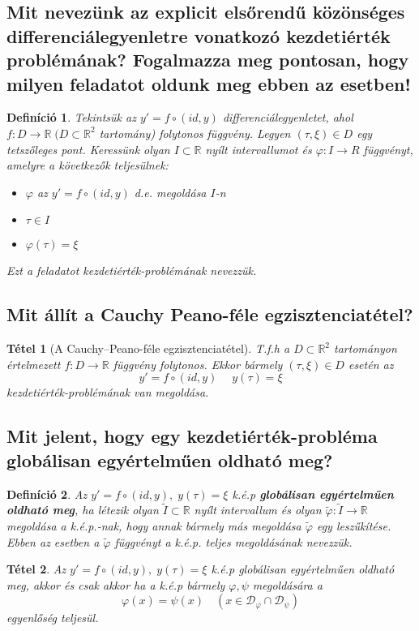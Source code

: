 \documentclass[12pt,a4paper]{article}
\newcommand{\R}{\mathbb{R}}
\newcommand{\CD}{\mathcal{D}}
\newcommand{\f}{\varphi}
\newcommand{\bb}[1]{\left( #1 \right)}
\newtheorem{tet}{Tétel}[section]
\newtheorem{defi}{Definíció}[section]
\begin{document}
\subsection{Mit nevezünk az explicit elsőrendű közönséges differenciálegyenletre vonatkozó kezdetiérték problémának? Fogalmazza meg pontosan, hogy milyen feladatot oldunk meg ebben az esetben!}
\begin{defi}
Tekintsük az $y' = f \circ (id, y)$ differenciálegyenletet, ahol $f : D \to \R \; (D \subset \R^2$ tartomány) folytonos függvény. Legyen $(\tau, \xi) \in D$ egy tetszőleges pont. Keressünk olyan $I \subset \R$ nyílt intervallumot és $\f : I \to R$ függvényt, amelyre a következők teljesülnek:
\begin{itemize}
\item $\f$ az $y' = f \circ (id,y)$ d.e. megoldása $I$-n
\item $\tau \in I$
\item $\f(\tau) = \xi$ 
\end{itemize} 
Ezt a feladatot kezdetiérték-problémának nevezzük.
\end{defi}
\subsection{Mit állít a Cauchy Peano-féle egzisztenciatétel?}
\begin{tet}[A Cauchy–Peano-féle egzisztenciatétel]
T.f.h a $D \subset \R^2$ tartományon értelmezett $f: D \to \R$ függvény folytonos. Ekkor bármely $\bb{\tau,\xi} \in D$ esetén az 
\[
y' = f \circ \bb{id,y} \quad \; y(\tau) = \xi
\]
kezdetiérték-problémának van megoldása.
\end{tet}
\subsection{Mit jelent, hogy egy kezdetiérték-probléma globálisan egyértelműen oldható meg?}
\begin{defi}
Az $y' = f \circ \bb{id,y}, \; y(\tau) = \xi$ k.é.p \textbf{globálisan egyértelműen oldható meg}, ha létezik olyan $\tilde{I} \subset \R$ nyílt intervallum és olyan $\tilde{\f}: \tilde{I} \to \R$ megoldása a k.é.p.-nak, hogy annak bármely más megoldása $\tilde{\f}$ egy leszűkítése. Ebben az esetben
a $\tilde{\f}$ függvényt a k.é.p. teljes megoldásának nevezzük.
\end{defi}
\begin{tet}
Az $y' = f \circ \bb{id,y}, \; y(\tau) = \xi$ k.é.p globálisan egyértelműen oldható meg, akkor és csak akkor ha a k.é.p bármely $\f,\psi$ megoldására a
\[
\f(x) = \psi(x) \quad \bb{x \in \CD_\f \cap \CD_\psi}
\]
egyenlőség teljesül.
\end{tet}
\end{document}
